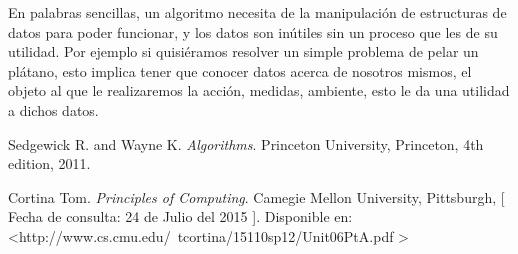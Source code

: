 \documentclass[spanish,12pt,letterpapper]{article}
\begin{document}
	En palabras sencillas, un algoritmo necesita de la manipulaci\'on de estructuras de datos para poder funcionar, y los datos son in\'utiles sin un proceso que les de su utilidad. Por ejemplo si quisi\'eramos resolver un simple problema de pelar un pl\'atano, esto implica tener que conocer datos acerca de nosotros mismos, el objeto al que le realizaremos la acci\'on, medidas, ambiente, esto le da una utilidad a dichos datos. 
	
	\pagebreak
	
	\begin{thebibliography}{9}
		 Sedgewick R. and Wayne K. 
		\emph{Algorithms}. Princeton University, Princeton, 4th edition, 2011.
		
		 Cortina Tom. 
		\emph{Principles of Computing}. Camegie Mellon University, Pittsburgh,  {[} Fecha de consulta: 24 de Julio del 2015 {]}. Disponible en: \textless http://www.cs.cmu.edu/~tcortina/15110sp12/Unit06PtA.pdf \textgreater
	\end{thebibliography}
	
\end{document}
